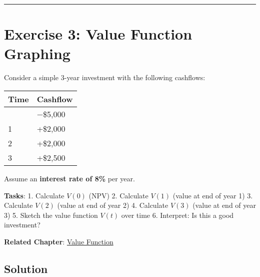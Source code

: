 \documentclass[
  letterpaper,
]{scrbook}
\begin{document}
\begin{center}\rule{0.5\linewidth}{0.5pt}\end{center}

\section{Exercise 3: Value Function
Graphing}\label{exercise-3-value-function-graphing}

\begin{tcolorbox}[enhanced jigsaw, toptitle=1mm, colbacktitle=quarto-callout-note-color!10!white, opacityback=0, leftrule=.75mm, breakable, colframe=quarto-callout-note-color-frame, toprule=.15mm, opacitybacktitle=0.6, coltitle=black, bottomrule=.15mm, colback=white, arc=.35mm, titlerule=0mm, rightrule=.15mm, left=2mm, title=\textcolor{quarto-callout-note-color}{\faInfo}\hspace{0.5em}{Problem}, bottomtitle=1mm]

Consider a simple 3-year investment with the following cashflows:

\begin{longtable}[]{@{}ll@{}}
\toprule\noalign{}
Time & Cashflow \\
\midrule\noalign{}
\endhead
\bottomrule\noalign{}
\endlastfoot
0 & −\$5,000 \\
1 & +\$2,000 \\
2 & +\$2,000 \\
3 & +\$2,500 \\
\end{longtable}

Assume an \textbf{interest rate of 8\%} per year.

\textbf{Tasks}: 1. Calculate \(V(0)\) (NPV) 2. Calculate \(V(1)\) (value
at end of year 1) 3. Calculate \(V(2)\) (value at end of year 2) 4.
Calculate \(V(3)\) (value at end of year 3) 5. Sketch the value function
\(V(t)\) over time 6. Interpret: Is this a good investment?

\textbf{Related Chapter}: \hyperref[value-function]{Value Function}

\end{tcolorbox}

\subsection*{Solution}\label{solution-2}
\end{document}
